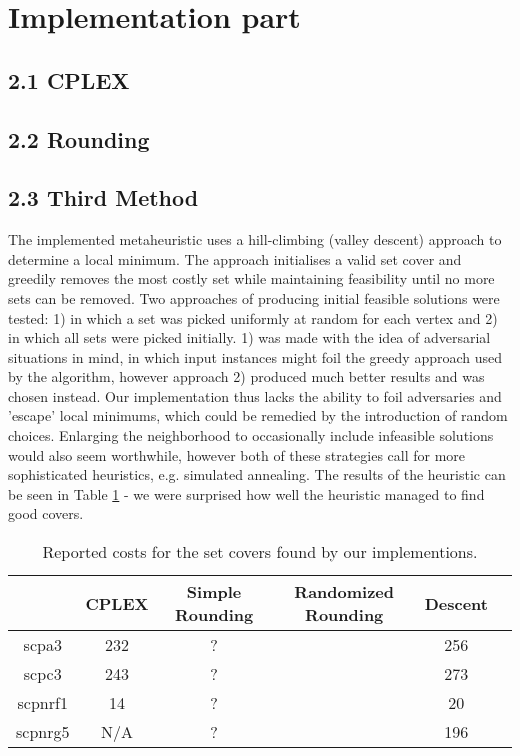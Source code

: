 \documentclass[12pt]{article}
\begin{document}
\pagebreak
\section*{Implementation part}
\subsection*{2.1 CPLEX}

\subsection*{2.2 Rounding}

\subsection*{2.3 Third Method}
The implemented metaheuristic uses a hill-climbing (valley descent) approach to determine a local minimum. The approach initialises a valid set cover and greedily removes the most costly set while maintaining feasibility until no more sets can be removed. Two approaches of producing initial feasible solutions were tested: 1) in which a set was picked uniformly at random for each vertex and 2) in which all sets were picked initially. 1) was made with the idea of adversarial situations in mind, in which input instances might foil the greedy approach used by the algorithm, however approach 2) produced much better results and was chosen instead. Our implementation thus lacks the ability to foil adversaries and 'escape' local minimums, which could be remedied by the introduction of random choices. Enlarging the neighborhood to occasionally include infeasible solutions would also seem worthwhile, however both of these strategies call for more sophisticated heuristics, e.g. simulated annealing. The results of the heuristic can be seen in Table \ref{times} - we were surprised how well the heuristic managed to find good covers.

\begin{table}[!hbt]
\center
\begin{tabular}{|c | c | c | c | c | c |}
\hline
& \multicolumn{1}{|c|}{CPLEX} & \multicolumn{1}{|c|}{Simple Rounding} & Randomized Rounding & \multicolumn{1}{|c|}{Descent} \\
\hline
scpa3 & 232 & ? & & 256 \\
\hline
scpc3 & 243 & ? & & 273 \\
\hline
scpnrf1 & 14 & ? & & 20 \\
\hline
scpnrg5 & N/A & ? & & 196 \\
\hline 
\end{tabular}
\caption{Reported costs for the set covers found by our implementions.
\label{times}}
\end{table}
\end{document}
